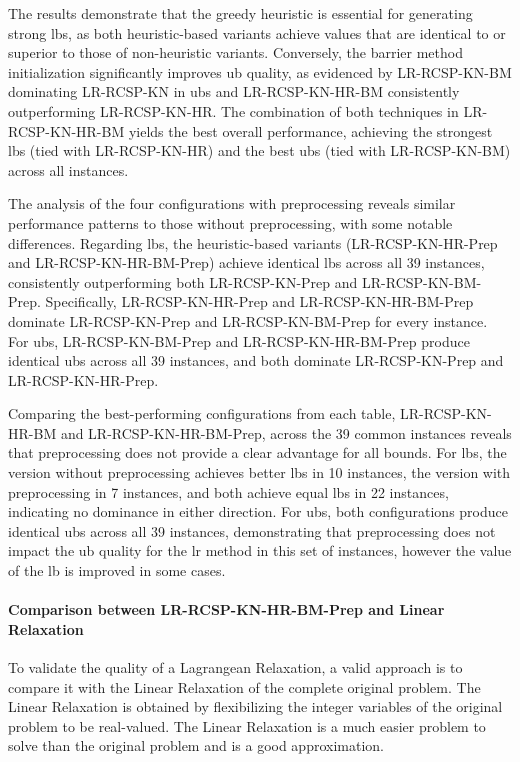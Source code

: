 The results demonstrate that the greedy heuristic is essential for generating strong \gls{lb}s, as both heuristic-based variants achieve values that are identical to or superior to those of non-heuristic variants.
Conversely, the barrier method initialization significantly improves \gls{ub} quality, as evidenced by LR-RCSP-KN-BM dominating LR-RCSP-KN in \gls{ub}s and LR-RCSP-KN-HR-BM consistently outperforming LR-RCSP-KN-HR.
The combination of both techniques in LR-RCSP-KN-HR-BM yields the best overall performance, achieving the strongest \gls{lb}s (tied with LR-RCSP-KN-HR) and the best \gls{ub}s (tied with LR-RCSP-KN-BM) across all instances.

The analysis of the four configurations with preprocessing reveals similar performance patterns to those without preprocessing, with some notable differences.
Regarding \gls{lb}s, the heuristic-based variants (LR-RCSP-KN-HR-Prep and LR-RCSP-KN-HR-BM-Prep) achieve identical \gls{lb}s across all 39 instances, consistently outperforming both LR-RCSP-KN-Prep and LR-RCSP-KN-BM-Prep.
Specifically, LR-RCSP-KN-HR-Prep and LR-RCSP-KN-HR-BM-Prep dominate LR-RCSP-KN-Prep and LR-RCSP-KN-BM-Prep for every instance.
For \gls{ub}s, LR-RCSP-KN-BM-Prep and LR-RCSP-KN-HR-BM-Prep produce identical \gls{ub}s across all 39 instances, and both dominate LR-RCSP-KN-Prep and LR-RCSP-KN-HR-Prep.

Comparing the best-performing configurations from each table, LR-RCSP-KN-HR-BM and LR-RCSP-KN-HR-BM-Prep, across the 39 common instances reveals that preprocessing does not provide a clear advantage for all bounds. For \gls{lb}s, the version without preprocessing achieves better \gls{lb}s in 10 instances, the version with preprocessing in 7 instances, and both achieve equal \gls{lb}s in 22 instances, indicating no dominance in either direction. For \gls{ub}s, both configurations produce identical \gls{ub}s across all 39 instances, demonstrating that preprocessing does not impact the \gls{ub} quality for the \gls{lr} method in this set of instances, however the value of the \gls{lb} is improved in some cases.

\paragraph{Comparison between LR-RCSP-KN-HR-BM-Prep and Linear Relaxation}

To validate the quality of a Lagrangean Relaxation, a valid approach is to compare it with the Linear Relaxation of the complete original problem. The Linear Relaxation is obtained by flexibilizing the integer variables of the original problem to be real-valued. The Linear Relaxation is a much easier problem to solve than the original problem and is a good approximation.

